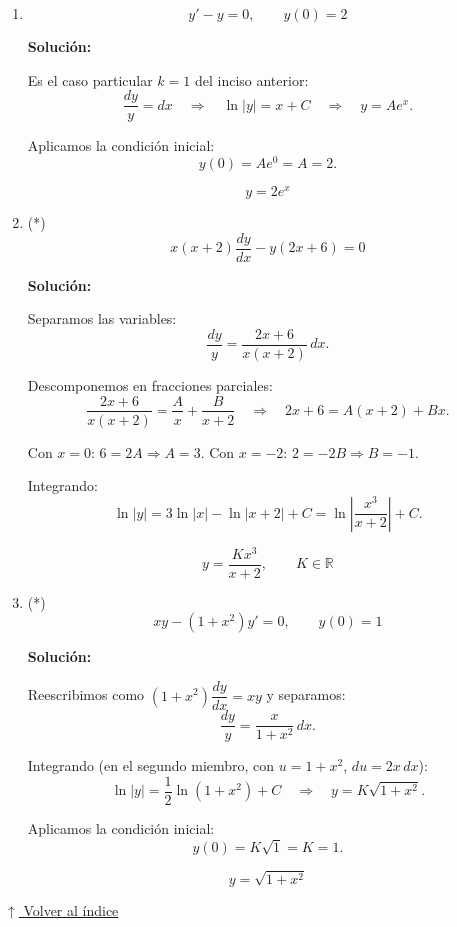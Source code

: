 \documentclass[12pt]{article}
\newcommand{\solucion}{%
    \vspace{0.8em}%
    \textbf{Solución:}%
}
\newcommand{\volverindice}{%
    \vspace{1em}%
    \begin{flushright}%
        \hyperlink{indice}{\small $\uparrow$ Volver al índice}%
    \end{flushright}%
}
\begin{document}
\begin{enumerate}[label=\alph*.-]
    \item
    \[
    y'-y=0,\qquad y(0)=2
    \]

    \solucion

    Es el caso particular $k=1$ del inciso anterior:
    \[
    \frac{dy}{y}=dx
    \quad\Rightarrow\quad
    \ln|y|=x+C
    \quad\Rightarrow\quad
    y=Ae^{x}.
    \]

    Aplicamos la condición inicial:
    \[
    y(0)=Ae^0=A=2.
    \]

    \[
    \boxed{
    y=2e^{x}
    }
    \]


    \item (*)
    \[
    x(x+2)\frac{dy}{dx}-y(2x+6)=0
    \]

    \solucion

    Separamos las variables:
    \[
    \frac{dy}{y}=\frac{2x+6}{x(x+2)}\,dx.
    \]

    Descomponemos en fracciones parciales:
    \[
    \frac{2x+6}{x(x+2)}=\frac Ax+\frac{B}{x+2}
    \quad\Rightarrow\quad
    2x+6=A(x+2)+Bx.
    \]

    Con $x=0$: $6=2A\Rightarrow A=3$.
    Con $x=-2$: $2=-2B\Rightarrow B=-1$.

    Integrando:
    \[
    \ln|y|=3\ln|x|-\ln|x+2|+C=\ln\left|\frac{x^3}{x+2}\right|+C.
    \]

    \[
    \boxed{
    y=\frac{Kx^3}{x+2},\qquad K\in\mathbb{R}
    }
    \]


    \item (*)
    \[
    xy-(1+x^2)y'=0,\qquad y(0)=1
    \]

    \solucion

    Reescribimos como $(1+x^2)\dfrac{dy}{dx}=xy$ y separamos:
    \[
    \frac{dy}{y}=\frac{x}{1+x^2}\,dx.
    \]

    Integrando (en el segundo miembro, con $u=1+x^2$, $du=2x\,dx$):
    \[
    \ln|y|=\frac12\ln\left(1+x^2\right)+C
    \quad\Rightarrow\quad
    y=K\sqrt{1+x^2}.
    \]

    Aplicamos la condición inicial:
    \[
    y(0)=K\sqrt1=K=1.
    \]

    \[
    \boxed{
    y=\sqrt{1+x^2}
    }
    \]

\end{enumerate}

\volverindice
\newpage
\end{document}
